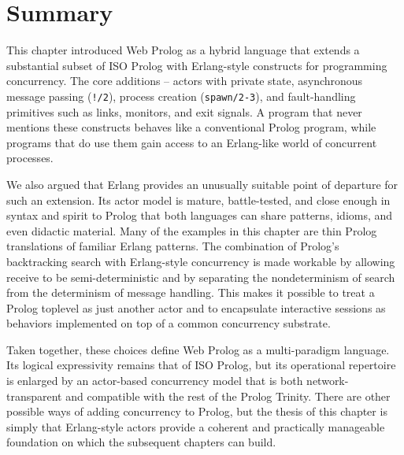 \section{Summary}\label{sec:discussion-revised}

This chapter introduced Web Prolog as a hybrid language that extends a substantial subset of ISO Prolog with Erlang-style constructs for programming concurrency. The core additions -- actors with private state, asynchronous message passing (\texttt{!/2}), process creation (\texttt{spawn/2-3}), and fault-handling primitives such as links, monitors, and exit signals. A program that never mentions these constructs behaves like a conventional Prolog program, while programs that do use them gain access to an Erlang-like world of concurrent processes.

We also argued that Erlang provides an unusually suitable point of departure for such an extension. Its actor model is mature, battle-tested, and close enough in syntax and spirit to Prolog that both languages can share patterns, idioms, and even didactic material. Many of the examples in this chapter are thin Prolog translations of familiar Erlang patterns. The combination of Prolog's backtracking search with Erlang-style concurrency is made workable by allowing receive to be semi-deterministic and by separating the nondeterminism of search from the determinism of message handling. This makes it possible to treat a Prolog toplevel as just another actor and to encapsulate interactive sessions as behaviors implemented on top of a common concurrency substrate.

Taken together, these choices define Web Prolog as a multi-paradigm language. Its logical expressivity remains that of ISO Prolog, but its operational repertoire is enlarged by an actor-based concurrency model that is both network-transparent and compatible with the rest of the Prolog Trinity. There are other possible ways of adding concurrency to Prolog, but the thesis of this chapter is simply that Erlang-style actors provide a coherent and practically manageable foundation on which the subsequent chapters can build.

